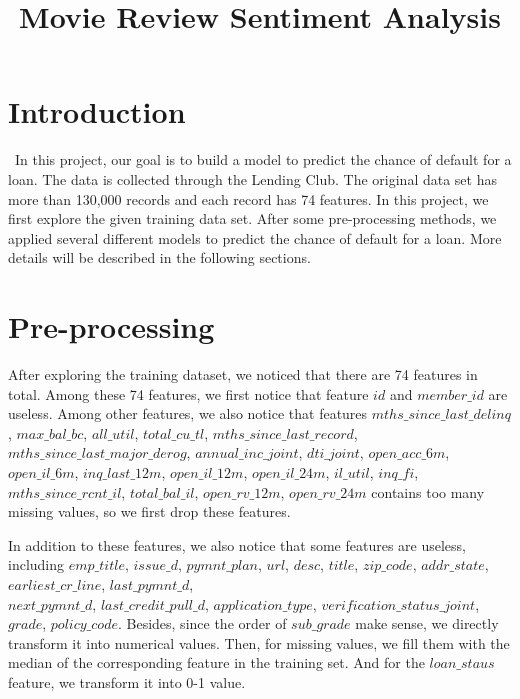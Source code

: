\documentclass[12pt]{article}
\title{Movie Review Sentiment Analysis}
\begin{document}
%
\maketitle

\section{Introduction}
\quad\ In this project, our goal is to build a model to predict the chance of default for a loan. The data is collected through the Lending Club. The original data set has more than 130,000 records and each record has 74 features. In this project, we first explore the given training data set. After some pre-processing methods, we applied several different models to predict the chance of default for a loan. More details will be described in the following sections.

\section{Pre-processing}
After exploring the training dataset, we noticed that there are 74 features in total. Among these 74 features, we first notice that feature $id$ and $member\_id$ are useless. Among other features, we also notice that features $mths\_since\_last\_delinq$, $ max\_bal\_bc $, $ all\_util $, $ total\_cu\_tl $, $ mths\_since\_last\_record$, \\$ mths\_since\_last\_major\_derog $, $ annual\_inc\_joint $, $ dti\_joint $, $ open\_acc\_6m $, $ open\_il\_6m $, $ inq\_last\_12m $, $ open\_il\_12m $, $ open\_il\_24m $, $ il\_util $, $ inq\_fi $, \\$ mths\_since\_rcnt\_il $, $ total\_bal\_il $, $ open\_rv\_12m $, $ open\_rv\_24m $ contains too many missing values, so we first drop these features.

In addition to these features, we also notice that some features are useless, including $emp\_title$, $issue\_d$, $pymnt\_plan$, $url$, $desc$, $title$, $zip\_code$, $addr\_state$, $earliest\_cr\_line$, $last\_pymnt\_d$, \\$next\_pymnt\_d$, $last\_credit\_pull\_d$, $application\_type$, $verification\_status\_joint$, $grade$, $policy\_code$. Besides, since the order of $sub\_grade$ make sense, we directly transform it into numerical values. Then, for missing values, we fill them with the median of the corresponding feature in the training set. And for the $loan\_staus$ feature, we transform it into 0-1 value.
\end{document}
